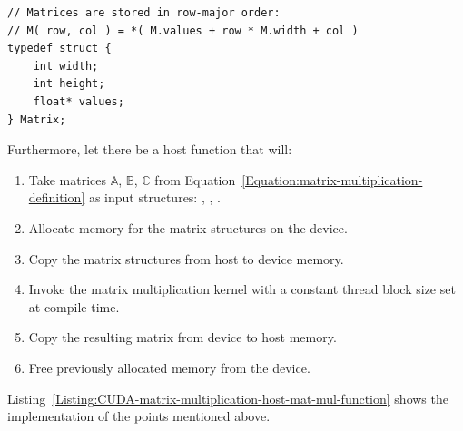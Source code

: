 \begin{lstlisting}[caption={Definition of the structure that will represent a matrix. The \code{width} variable stores the number of columns and \code{height} stores the number of rows the matrix has. The elements of the matrix are stored in row-major order in the single-precision (float) array: \code{values}. Taken from Nvidia's \emph{CUDA C++ Programming Guide} \cite{NVIDIAMay2022}.},label={Listing:CUDA-matrix-multiplication-matrix-structure-definition}]
// Matrices are stored in row-major order:
// M( row, col ) = *( M.values + row * M.width + col )
typedef struct {
	int width;
	int height;
	float* values;
} Matrix;
\end{lstlisting}

Furthermore, let there be a host function  that will:

\begin{enumerate}
	\item Take matrices $ \mathbb{A} $, $ \mathbb{B} $, $ \mathbb{C} $ from Equation~\ref{Equation:matrix-multiplication-definition} as input structures: , , .
	\item Allocate memory for the matrix structures on the device.
	\item Copy the matrix structures from host to device memory.
	\item Invoke the matrix multiplication kernel with a constant thread block size set at compile time.
	\item Copy the resulting matrix from device to host memory.
	\item Free previously allocated memory from the device.
\end{enumerate}

Listing~\ref{Listing:CUDA-matrix-multiplication-host-mat-mul-function} shows the implementation of the points mentioned above.

